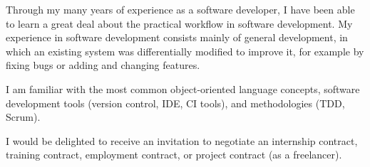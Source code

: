 		Through my many years of experience as a software developer, I have been able to learn a great deal about the practical workflow in software development.  
		My experience in software development consists mainly of general development, in which an existing system was differentially modified to improve it, for example by fixing bugs or adding and changing features.

		I am familiar with the most common object-oriented language concepts, software development tools (version control, IDE, CI tools), and methodologies (TDD, Scrum).

		I would be delighted to receive an invitation to negotiate an internship contract, training contract, employment contract, or project contract (as a freelancer).
\versionLanguageEnd